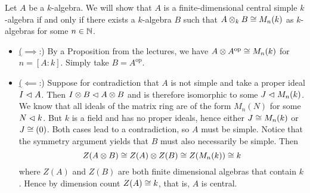 \documentclass[a4paper, 12pt]{article}
\begin{document}
\begin{Exercise}
    Let $A$ be a $k$-algebra. We will show that $A$ is a finite-dimensional central simple $k$-algebra
    if and only if
    there exists a $k$-algebra $B$ such that $A \otimes_k B \cong M_n(k)$ as $k$-algebras for some $n \in \mathbb{N}$.

    \begin{itemize}
        \item \underline{($\implies$}:)
            By a Proposition from the lectures,
            we have $A \otimes A^{\text{op}} \cong M_n(k)$ for $n = [A : k]$.
            Simply take $B = A^{\text{op}}$.
        \item \underline{($\impliedby$}:)
            Suppose for contradiction that $A$ is not simple and take a proper ideal $I \vartriangleleft A$.
            Then $I \otimes B \vartriangleleft A \otimes B$ and is therefore isomorphic to some $J \vartriangleleft M_n(k)$.
            We know that all ideals of the matrix ring are of the form $M_n(N)$ for some $N \vartriangleleft k$.
            But $k$ is a field and has no proper ideals, hence either $J \cong M_n(k)$ or $J \cong (0)$.
            Both cases lead to a contradiction, so $A$ must be simple.
            Notice that the symmetry argument yields that $B$ must also necessarily be simple.
            Then
            \[
                Z(A \otimes B) \cong Z(A) \otimes Z(B) \cong Z(M_n(k)) \cong k
            \]
            where $Z(A)$ and $Z(B)$ are both finite dimensional algebras that contain $k$.
            Hence by dimension count $Z(A) \cong k$, that is, $A$ is central.
    \end{itemize}
\end{Exercise}
\end{document}
